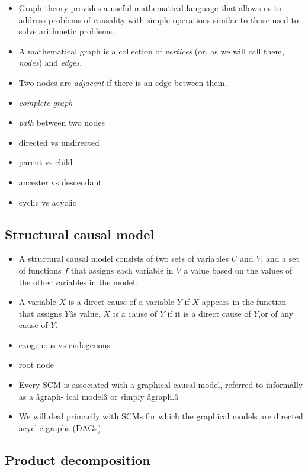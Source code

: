 \documentclass[]{article}
\begin{document}
\begin{itemize}
\item
  Graph theory provides a useful mathematical language that allows us to
  address problems of causality with simple operations similar to those
  used to solve arithmetic problems.
\item
  A mathematical graph is a collection of \emph{vertices} (or, as we
  will call them, \emph{nodes}) and \emph{edges}.
\item
  Two nodes are \emph{adjacent} if there is an edge between them.
\item
  \emph{complete graph}
\item
  \emph{path} between two nodes
\item
  directed vs undirected
\item
  parent vs child
\item
  ancester vs descendant
\item
  cyclic vs acyclic
\end{itemize}

\subsection{Structural causal model}\label{structural-causal-model}

\begin{itemize}
\item
  A structural causal model consists of two sets of variables \(U\) and
  \(V\), and a set of functions \(f\) that assigns each variable in
  \(V\) a value based on the values of the other variables in the model.
\item
  A variable \(X\) is a direct cause of a variable \(Y\) if \(X\)
  appears in the function that assigns \(Y\)âs value. \(X\) is a cause
  of \(Y\) if it is a direct cause of \(Y\),or of any cause of \(Y\).
\item
  exogenous vs endogenous
\item
  root node
\item
  Every SCM is associated with a graphical causal model, referred to
  informally as a âgraph- ical modelâ or simply âgraph.â
\item
  We will deal primarily with SCMs for which the graphical models are
  directed acyclic graphs (DAGs).
\end{itemize}

\subsection{Product decomposition}\label{product-decomposition}
\end{document}
